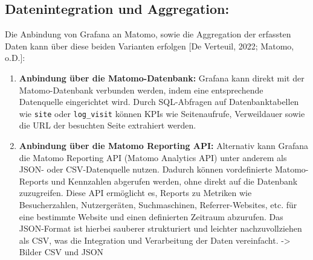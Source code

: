 \subsection{Datenintegration und Aggregation:}
Die Anbindung von Grafana an Matomo, sowie die Aggregation der erfassten Daten kann über diese beiden Varianten erfolgen [De Verteuil, 2022; Matomo, o.D.]:

\begin{enumerate}
    \item \textbf{Anbindung über die Matomo-Datenbank:}  
    Grafana kann direkt mit der Matomo-Datenbank verbunden werden, indem eine entsprechende Datenquelle eingerichtet wird. Durch SQL-Abfragen auf Datenbanktabellen wie \verb|site| oder \verb|log_visit| können KPIs wie Seitenaufrufe, Verweildauer sowie die URL der besuchten Seite extrahiert werden.

    \item \textbf{Anbindung über die Matomo Reporting API:}  
    Alternativ kann Grafana die Matomo Reporting API (Matomo Analytics API) unter anderem als JSON- oder CSV-Datenquelle nutzen. Dadurch können vordefinierte Matomo-Reports und Kennzahlen abgerufen werden, ohne direkt auf die Datenbank zuzugreifen. Diese API ermöglicht es, Reports zu Metriken wie Besucherzahlen, Nutzergeräten, Suchmaschinen, Referrer-Websites, etc. für eine bestimmte Website und einen definierten Zeitraum abzurufen. Das JSON-Format ist hierbei sauberer strukturiert und leichter nachzuvollziehen als CSV, was die Integration und Verarbeitung der Daten vereinfacht. -> Bilder CSV und JSON
\end{enumerate}















